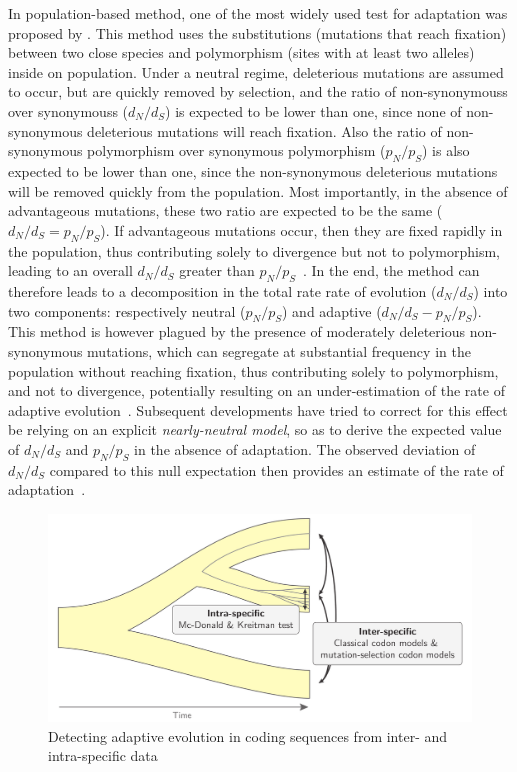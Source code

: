 In population-based method, one of the most widely used test for adaptation was proposed by \citet{McDonald1991}. This method uses the \glspl{substitution} (mutations that reach fixation) between two close species and polymorphism (sites with at least two alleles) inside on population. Under a \gls{neutral} regime, deleterious mutations are assumed to occur, but are quickly removed by selection, and the ratio of \glspl{non-synonymous} over \glspl{synonymous} ($d_N/d_S$) is expected to be lower than one, since none of non-synonymous deleterious mutations will reach fixation. Also the ratio of non-synonymous polymorphism over synonymous polymorphism ($p_N/p_S$) is also expected to be lower than one, since the non-synonymous deleterious mutations will be removed quickly from the population. Most importantly, in the absence of advantageous mutations, these two ratio are expected to be the same ($d_N/d_S=p_N/p_S$). If advantageous mutations occur, then they are fixed rapidly in the population, thus contributing solely to divergence but not to polymorphism, leading to an overall $d_N/d_S$ greater than $p_N/p_S$~\citep{smith_adaptive_2002}. In the end, the method can therefore leads to a decomposition in the total rate rate of evolution ($d_N/d_S$) into two components: respectively \gls{neutral} ($p_N/p_S$) and adaptive ($d_N/d_S-p_N/p_S$). This method is however plagued by the presence of moderately deleterious non-synonymous mutations, which can segregate at substantial frequency in the population without reaching fixation, thus contributing solely to polymorphism, and not to divergence, potentially resulting on an under-estimation of the rate of adaptive evolution~\citep{eyre-walker_quantifying_2002}. Subsequent developments have tried to correct for this effect be relying on an explicit \textit{nearly-neutral model}, so as to derive the expected value of $d_N/d_S$ and $p_N/p_S$ in the absence of adaptation. The observed deviation of $d_N/d_S$ compared to this null expectation then provides an estimate of the rate of adaptation~\citep{eyre-walker_estimating_2009, Galtier2016}.

\begin{figure}[thbp]
	\centering
	\includegraphics[width=\textwidth] {figures/inter-intra}
	\caption{Detecting adaptive evolution in coding sequences from inter- and intra-specific data}
\end{figure}

